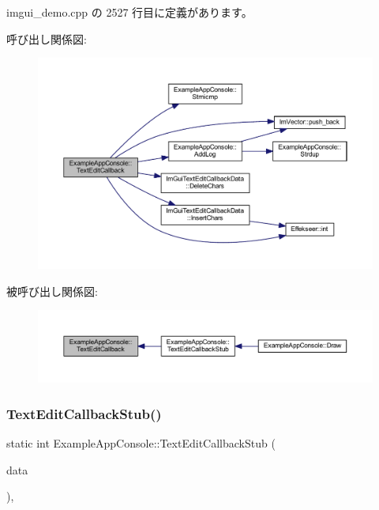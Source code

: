  imgui\+\_\+demo.\+cpp の 2527 行目に定義があります。

呼び出し関係図\+:\nopagebreak
\begin{figure}[H]
\begin{center}
\leavevmode
\includegraphics[width=350pt]{struct_example_app_console_aae97c81ddab660e6e0296c21844c4a7b_cgraph}
\end{center}
\end{figure}
被呼び出し関係図\+:\nopagebreak
\begin{figure}[H]
\begin{center}
\leavevmode
\includegraphics[width=350pt]{struct_example_app_console_aae97c81ddab660e6e0296c21844c4a7b_icgraph}
\end{center}
\end{figure}
\mbox{\label{struct_example_app_console_a722d9b5dc6df127f27c83afeee29bfd3}} 
\subsubsection{\texorpdfstring{Text\+Edit\+Callback\+Stub()}{TextEditCallbackStub()}}
{\footnotesize\ttfamily static int Example\+App\+Console\+::\+Text\+Edit\+Callback\+Stub (\begin{DoxyParamCaption}\item[{\mbox{\hyperlink{struct_im_gui_text_edit_callback_data}{Im\+Gui\+Text\+Edit\+Callback\+Data}} $\ast$}]{data }\end{DoxyParamCaption})\hspace{0.3cm}{\ttfamily [inline]}, {\ttfamily [static]}}



